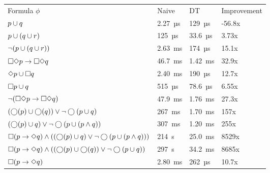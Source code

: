 \begin{table}[!ht]
    \centering
    \makeatletter
           \def\rulecolor#1#{\CT@arc{#1}}
           \def\CT@arc#1#2{%
           \ifdim\baselineskip=\z@\noalign\fi
           {\gdef\CT@arc@{\color#1{#2}}}}
           \let\CT@arc@\relax
        \makeatother
    \begin{tabular}{@{}llll@{}}
        \toprule
        Formula $\phi$ & Naive & DT & Improvement \\ 
        \cmidrule(r){1-1}\cmidrule(lr){2-2}\cmidrule(lr){3-3}\cmidrule(l){4-4}
        $p \cup q$                                                                                    & 2.27~µs    & 129~µs     & -56.8x \\
        $p \cup (q \cup r)$                                                                             & 125~µs     & 33.6~µs    & 3.73x \\
        $\lnot(p \cup (q \cup r))$                                                                      & 2.63~ms    & 174~µs     & 15.1x \\
        $\square \Diamond p \rightarrow \square \Diamond q$                                                                    & 46.7~ms    & 1.42~ms    & 32.9x \\
        $\Diamond  p \cup \square q$                                                                             & 2.40~ms    & 190~µs     & 12.7x \\
        \midrule
        $\square  p \cup q$                                                                                & 515~µs     & 78.6~µs    & 6.55x \\
        $\lnot(\square \Diamond p \rightarrow \square \Diamond q)$                                                             & 47.9~ms    & 1.76~ms    & 27.3x \\
        $(\bigcirc (p) \cup \bigcirc (q)) \lor \lnot \bigcirc (p \cup q)$                                                 & 267~ms     & 1.70~ms    & 157x \\
        $(\bigcirc (p) \cup q) \lor \lnot \bigcirc (p \cup (p \land q))$                                            & 307~ms     & 1.20~ms    & 255x \\
        $\square  (p \rightarrow \Diamond  q) \land ((\bigcirc (p) \cup q) \lor \lnot \bigcirc (p \cup (p \land q)))$               & 214~s      & 25.0~ms    & 8529x \\
        \midrule
        $\square  (p \rightarrow \Diamond  q) \land ((\bigcirc (p) \cup \bigcirc (q)) \lor \lnot \bigcirc (p \cup q))$                    & 297~s      & 34.2~ms    & 8685x \\
        $\square  (p \rightarrow \Diamond  q)$                                                                      & 2.80~ms    & 262~µs     & 10.7x \\

\end{tabular}
\end{table}
